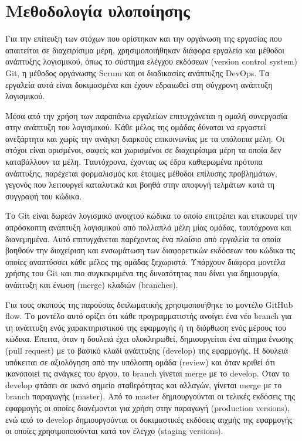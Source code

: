 \section{Μεθοδολογία υλοποίησης} \label{subsection:4-1-implementation-methodology}

Για την επίτευξη των στόχων που ορίστηκαν και την οργάνωση της εργασίας που απαιτείται σε διαχειρίσιμα μέρη, χρησιμοποιήθηκαν διάφορα εργαλεία και μέθοδοι ανάπτυξης λογισμικού, όπως το σύστημα ελέγχου εκδόσεων (version control system) Git, η μέθοδος οργάνωσης Scrum και οι διαδικασίες ανάπτυξης DevOps. Τα εργαλεία αυτά είναι δοκιμασμένα και έχουν εδραιωθεί στη σύγχρονη ανάπτυξη λογισμικού.

Μέσα από την χρήση των παραπάνω εργαλείων επιτυγχάνεται η ομαλή συνεργασία στην ανάπτυξη του λογισμικού. Κάθε μέλος της ομάδας δύναται να εργαστεί ανεξάρτητα και χωρίς την ανάγκη διαρκούς επικοινωνίας με τα υπόλοιπα μέλη. Οι στόχοι είναι ορισμένοι, σαφείς και χωρισμένοι σε διαχειρίσιμα μέρη τα οποία δεν καταβάλλουν τα μέλη. Ταυτόχρονα, έχοντας ως έδρα καθιερωμένα πρότυπα ανάπτυξης, παρέχεται φορμαλισμός και έτοιμες μέθοδοι επίλυσης προβλημάτων, γεγονός που λειτουργεί καταλυτικά και βοηθά στην αποφυγή τελμάτων κατά τη συγγραφή του κώδικα.

Το Git είναι δωρεάν λογισμικό ανοιχτού κώδικα το οποίο επιτρέπει και επικουρεί την απρόσκοπτη ανάπτυξη λογισμικού από πολλαπλά μέλη μίας ομάδας, ταυτόχρονα και διανεμημένα. Αυτό επιτυγχάνεται παρέχοντας ένα πλαίσιο από εργαλεία τα οποία βοηθούν την διαχείριση και ενσωμάτωση των διαφορετικών εκδόσεων του κώδικα τις οποίες αναπτύσσει κάθε μέλος της ομάδας ξεχωριστά. Υπάρχουν διάφορα μοντέλα χρήσης του Git και πιο συγκεκριμένα της δυνατότητας που δίνει για δημιουργία, ανάπτυξη και ένωση (merge) κλαδιών (branches).

Για τους σκοπούς της παρούσας διπλωματικής χρησιμοποιήθηκε το μοντέλο GitHub flow.\cite{4.1-github-flow} Το μοντέλο αυτό ορίζει ότι κάθε προγραμματιστής ανοίγει ένα νέο branch για τη ανάπτυξη ενός χαρακτηριστικού της εφαρμογής ή τη διόρθωση ενός μέρους του κώδικα. Έπειτα, όταν η δουλειά έχει ολοκληρωθεί, δημιουργείται ένα αίτημα ένωσης (pull request) με το βασικό κλαδί ανάπτυξης (develop) της εφαρμογής. Η δουλειά υπόκειται σε αξιολόγηση από την υπόλοιπη ομάδα (review) και όταν κριθεί ότι ικανοποιεί τις ανάγκες του έργου, το branch γίνεται merge με το develop. Όταν το develop φτάσει σε ικανό σημείο σταθερότητας και αλλαγών, γίνεται merge με το branch παραγωγής (master). Από το master δημιουργούνται οι τελικές εκδόσεις της εφαρμογής οι οποίες διανέμονται για χρήση στην παραγωγή (production versions), ενώ από το develop δημιουργούνται οι δοκιμαστικές εκδόσεις αιχμής της εφαρμογής οι οποίες χρησιμοποιούνται κατά τον έλεγχο (staging versions).

